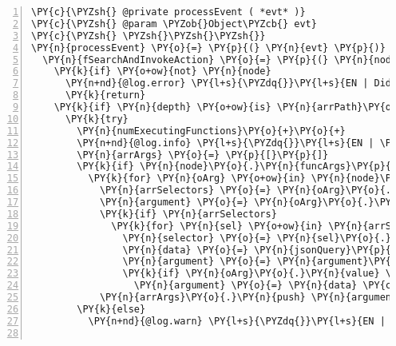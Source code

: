 \begin{Verbatim}[fontsize=\scriptsize,commandchars=\\\{\},numbers=left,firstnumber=1,stepnumber=1]
\PY{c}{\PYZsh{} @private processEvent ( *evt* )}
\PY{c}{\PYZsh{} @param \PYZob{}Object\PYZcb{} evt}
\PY{c}{\PYZsh{} \PYZsh{}\PYZsh{}\PYZsh{}}
\PY{n}{processEvent} \PY{o}{=} \PY{p}{(} \PY{n}{evt} \PY{p}{)} \PY{o}{=}\PY{o}{\PYZgt{}}
  \PY{n}{fSearchAndInvokeAction} \PY{o}{=} \PY{p}{(} \PY{n}{node}\PY{p}{,} \PY{n}{arrPath}\PY{p}{,} \PY{n}{funcName}\PY{p}{,} \PY{n}{evt}\PY{p}{,} \PY{n}{depth} \PY{p}{)} \PY{o}{=}\PY{o}{\PYZgt{}}
    \PY{k}{if} \PY{o+ow}{not} \PY{n}{node}
      \PY{n+nd}{@log.error} \PY{l+s}{\PYZdq{}}\PY{l+s}{EN | Didn}\PY{l+s}{\PYZsq{}}\PY{l+s}{t find property in rule list: }\PY{l+s}{\PYZdq{}} \PY{o}{+} \PY{n}{arrPath}\PY{o}{.}\PY{n}{join}\PY{p}{(} \PY{l+s}{\PYZsq{}}\PY{l+s}{, }\PY{l+s}{\PYZsq{}} \PY{p}{)} \PY{o}{+} \PY{l+s}{\PYZdq{}}\PY{l+s}{ at depth }\PY{l+s}{\PYZdq{}} \PY{o}{+} \PY{n}{depth}
      \PY{k}{return}
    \PY{k}{if} \PY{n}{depth} \PY{o+ow}{is} \PY{n}{arrPath}\PY{o}{.}\PY{n}{length}
      \PY{k}{try}
        \PY{n}{numExecutingFunctions}\PY{o}{+}\PY{o}{+}
        \PY{n+nd}{@log.info} \PY{l+s}{\PYZdq{}}\PY{l+s}{EN | \PYZsh{}\PYZob{} funcName \PYZcb{} executes...}\PY{l+s}{\PYZdq{}}
        \PY{n}{arrArgs} \PY{o}{=} \PY{p}{[}\PY{p}{]}
        \PY{k}{if} \PY{n}{node}\PY{o}{.}\PY{n}{funcArgs}\PY{p}{[} \PY{n}{funcName} \PY{p}{]}
          \PY{k}{for} \PY{n}{oArg} \PY{o+ow}{in} \PY{n}{node}\PY{o}{.}\PY{n}{funcArgs}\PY{p}{[} \PY{n}{funcName} \PY{p}{]}
            \PY{n}{arrSelectors} \PY{o}{=} \PY{n}{oArg}\PY{o}{.}\PY{n}{value}\PY{o}{.}\PY{n}{match} \PY{o}{/}\PY{c}{\PYZsh{}\PYZbs{}\PYZob{}(.*?)\PYZbs{}\PYZcb{}/g}
            \PY{n}{argument} \PY{o}{=} \PY{n}{oArg}\PY{o}{.}\PY{n}{value}
            \PY{k}{if} \PY{n}{arrSelectors}
              \PY{k}{for} \PY{n}{sel} \PY{o+ow}{in} \PY{n}{arrSelectors}
                \PY{n}{selector} \PY{o}{=} \PY{n}{sel}\PY{o}{.}\PY{n}{substring} \PY{l+m+mi}{2}\PY{p}{,} \PY{n}{sel}\PY{o}{.}\PY{n}{length} \PY{o}{\PYZhy{}} \PY{l+m+mi}{1}
                \PY{n}{data} \PY{o}{=} \PY{n}{jsonQuery}\PY{p}{(} \PY{n}{evt}\PY{o}{.}\PY{n}{body}\PY{p}{,} \PY{n}{selector} \PY{p}{)}\PY{o}{.}\PY{n}{nodes}\PY{p}{(}\PY{p}{)}\PY{p}{[} \PY{l+m+mi}{0} \PY{p}{]}
                \PY{n}{argument} \PY{o}{=} \PY{n}{argument}\PY{o}{.}\PY{n}{replace} \PY{n}{sel}\PY{p}{,} \PY{n}{data}
                \PY{k}{if} \PY{n}{oArg}\PY{o}{.}\PY{n}{value} \PY{o+ow}{is} \PY{n}{sel}
                  \PY{n}{argument} \PY{o}{=} \PY{n}{data} \PY{c}{\PYZsh{} if the user wants to pass an object, we allow him to do so}
            \PY{n}{arrArgs}\PY{o}{.}\PY{n}{push} \PY{n}{argument} \PY{c}{\PYZsh{} Add arguments to the array}
        \PY{k}{else}
          \PY{n+nd}{@log.warn} \PY{l+s}{\PYZdq{}}\PY{l+s}{EN | Weird! arguments not loaded for function }\PY{l+s}{\PYZsq{}}\PY{l+s}{\PYZsh{}\PYZob{} funcName \PYZcb{}}\PY{l+s}{\PYZsq{}}\PY{l+s}{!}\PY{l+s}{\PYZdq{}}
          

\end{Verbatim}
